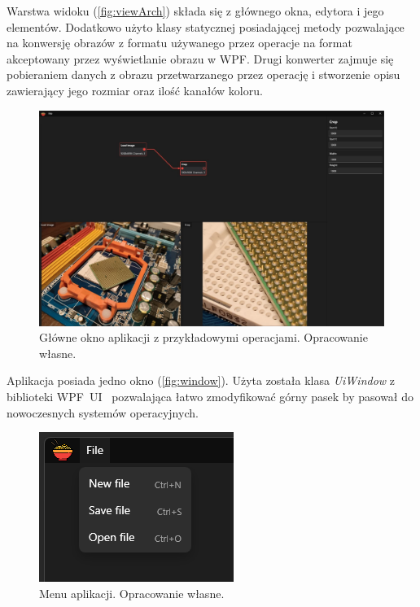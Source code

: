 Warstwa widoku (\autoref{fig:viewArch}) składa się z głównego okna, edytora i jego elementów.
Dodatkowo użyto klasy statycznej posiadającej metody pozwalające na konwersję obrazów z formatu używanego przez operacje na format akceptowany przez wyświetlanie obrazu w WPF.
Drugi konwerter zajmuje się pobieraniem danych z obrazu przetwarzanego przez operację i stworzenie opisu zawierający jego rozmiar oraz ilość kanałów koloru.

\begin{figure}[H]
    \centering
    \includegraphics[width=1\linewidth]{images/Picture13.jpg}
    \caption{Główne okno aplikacji z przykładowymi operacjami. Opracowanie własne.}
    \label{fig:window}
\end{figure}

Aplikacja posiada jedno okno (\autoref{fig:window}). 
Użyta została klasa \textit{UiWindow} z biblioteki WPF~UI~\cite{wpfui} pozwalająca łatwo zmodyfikować górny pasek by pasował do nowoczesnych systemów operacyjnych. 

\begin{figure}[H]
    \centering
    \includegraphics[width=0.6\linewidth]{images/Picture14.png}
    \caption{Menu aplikacji. Opracowanie własne.}
    \label{fig:mainmenu}
\end{figure}

